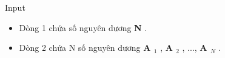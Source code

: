 Input
\begin{itemize}
	\item Dòng 1 chứa số nguyên dương \textbf{ N } .
	\item Dòng 2 chứa N số nguyên dương \textbf{ A $_ 1 $} , \textbf{ A $_ 2 $} , ..., \textbf{ A $_ N $} .
\end{itemize}
